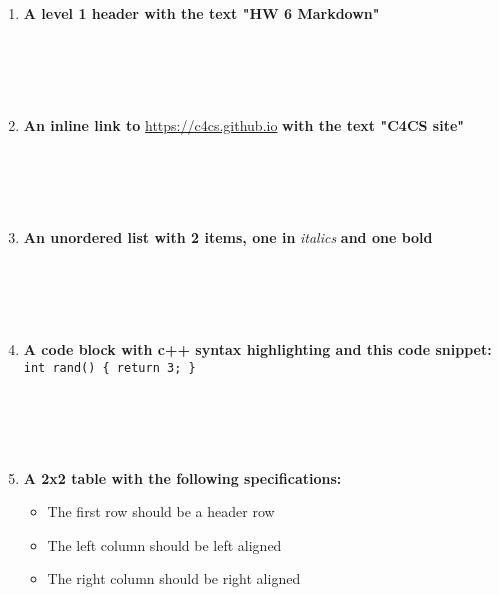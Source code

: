 \documentclass{article}
\begin{document}
\begin{enumerate}
	\item \textbf{A level 1 header with the text "HW 6 Markdown"} \\ \\ \\ \\ \\
	\item \textbf{An inline link to} \url{https://c4cs.github.io} \textbf{with the text "C4CS site"} \\ \\ \\ \\ \\
	\item \textbf{An unordered list with 2 items, one in} \textit{italics} \textbf{and one bold} \\ \\ \\ \\ \\
	\item \textbf{A code block with c++ syntax highlighting and this code snippet:} \texttt{int rand() \{ return 3; \} } \\ \\ \\ \\ \\
	\item \textbf{A 2x2 table with the following specifications:}
	\begin{itemize}
		\item The first row should be a header row
		\item The left column should be left aligned
		\item The right column should be right aligned
	\end{itemize}
\end{enumerate}
\end{document}
